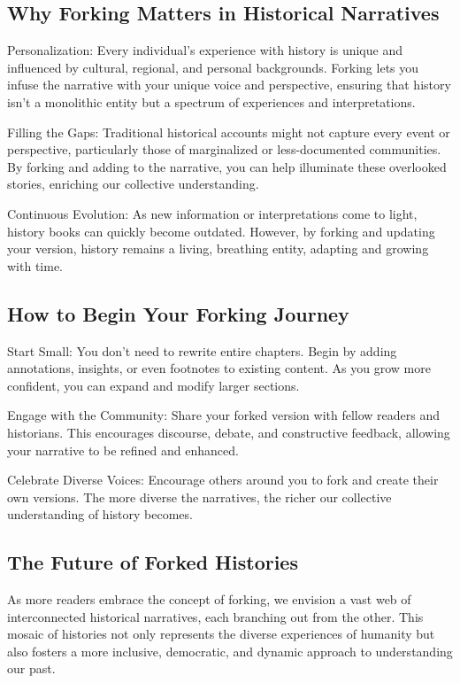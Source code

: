\documentclass{book}
\begin{document}
\subsection*{Why Forking Matters in Historical Narratives}

Personalization: Every individual's experience with history is unique and influenced by cultural, regional, and personal backgrounds. Forking lets you infuse the narrative with your unique voice and perspective, ensuring that history isn't a monolithic entity but a spectrum of experiences and interpretations.

Filling the Gaps: Traditional historical accounts might not capture every event or perspective, particularly those of marginalized or less-documented communities. By forking and adding to the narrative, you can help illuminate these overlooked stories, enriching our collective understanding.

Continuous Evolution: As new information or interpretations come to light, history books can quickly become outdated. However, by forking and updating your version, history remains a living, breathing entity, adapting and growing with time.

\subsection*{How to Begin Your Forking Journey}

Start Small: You don't need to rewrite entire chapters. Begin by adding annotations, insights, or even footnotes to existing content. As you grow more confident, you can expand and modify larger sections.

Engage with the Community: Share your forked version with fellow readers and historians. This encourages discourse, debate, and constructive feedback, allowing your narrative to be refined and enhanced.

Celebrate Diverse Voices: Encourage others around you to fork and create their own versions. The more diverse the narratives, the richer our collective understanding of history becomes.

\subsection*{The Future of Forked Histories}

As more readers embrace the concept of forking, we envision a vast web of interconnected historical narratives, each branching out from the other. This mosaic of histories not only represents the diverse experiences of humanity but also fosters a more inclusive, democratic, and dynamic approach to understanding our past.
\end{document}

